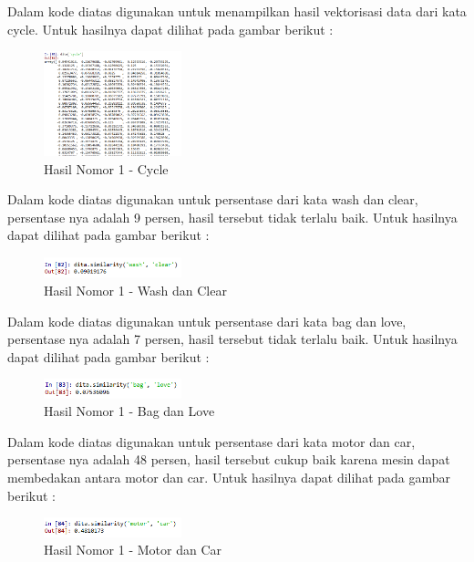 \begin{enumerate}

Dalam kode diatas digunakan untuk menampilkan hasil vektorisasi data dari kata cycle. Untuk hasilnya dapat dilihat pada gambar berikut :
\hfill\break
	\begin{figure}[H]
		\includegraphics[width=4cm]{figures/1174054/5/18.png}
		\centering
		\caption{Hasil Nomor 1 - Cycle}
	\end{figure}
	

Dalam kode diatas digunakan untuk persentase dari kata wash dan clear, persentase nya adalah 9 persen, hasil tersebut tidak terlalu baik. Untuk hasilnya dapat dilihat pada gambar berikut :
\hfill\break
	\begin{figure}[H]
		\includegraphics[width=4cm]{figures/1174054/5/19.png}
		\centering
		\caption{Hasil Nomor 1 - Wash dan Clear}
	\end{figure}


Dalam kode diatas digunakan untuk persentase dari kata bag dan love, persentase nya adalah 7 persen, hasil tersebut tidak terlalu baik. Untuk hasilnya dapat dilihat pada gambar berikut :
\hfill\break
	\begin{figure}[H]
		\includegraphics[width=4cm]{figures/1174054/5/20.png}
		\centering
		\caption{Hasil Nomor 1 - Bag dan Love}
	\end{figure}
	

Dalam kode diatas digunakan untuk persentase dari kata motor dan car, persentase nya adalah 48 persen, hasil tersebut cukup baik karena mesin dapat membedakan antara motor dan car. Untuk hasilnya dapat dilihat pada gambar berikut :
\hfill\break
	\begin{figure}[H]
		\includegraphics[width=4cm]{figures/1174054/5/21.png}
		\centering
		\caption{Hasil Nomor 1 - Motor dan Car}
	\end{figure}
	

\end{enumerate}
